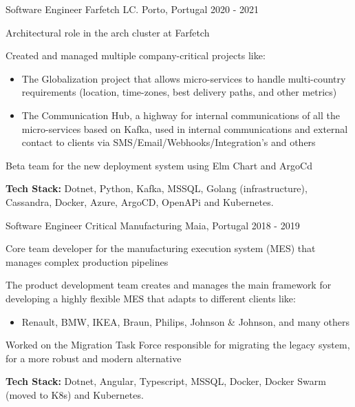 \begin{cventries}
  \cventry
    {Software Engineer} %
    {Farfetch LC.} %
    {Porto, Portugal} %
    {2020 - 2021} %
    {
      \begin{cvitems} %
        \item {Architectural role in the arch cluster at Farfetch}
        \item {Created and managed multiple company-critical projects like:}
        \begin{itemize}
         \item The Globalization project that allows micro-services to handle multi-country requirements (location, time-zones, best delivery paths, and other metrics)
         \item The Communication Hub, a highway for internal communications of all the micro-services based on Kafka, used in internal communications and external contact to clients via SMS/Email/Webhooks/Integration's and others
        \end{itemize}
        \item Beta team for the new deployment system using Elm Chart and ArgoCd
        \item {\textbf{Tech Stack:} Dotnet, Python, Kafka, MSSQL, Golang (infrastructure), Cassandra, Docker, Azure, ArgoCD, OpenAPi and Kubernetes.}
      \end{cvitems}
    }

  \cventry
    {Software Engineer} %
    {Critical Manufacturing} %
    {Maia, Portugal} %
    {2018 - 2019} %
    {
      \begin{cvitems} %
        \item {Core team developer for the manufacturing execution system (MES) that manages complex production pipelines}
        \item {The product development team creates and manages the main framework for
developing a highly flexible MES that adapts to different clients like:}
        \begin{itemize}
         \item Renault, BMW, IKEA, Braun, Philips, Johnson \& Johnson, and many others 
        \end{itemize}
        \item Worked on the Migration Task Force responsible for migrating the legacy system, for a more robust and modern alternative
        \item {\textbf{Tech Stack:} Dotnet, Angular, Typescript, MSSQL, Docker, Docker Swarm (moved to K8s) and Kubernetes.}
      \end{cvitems}
    }


\end{cventries}
